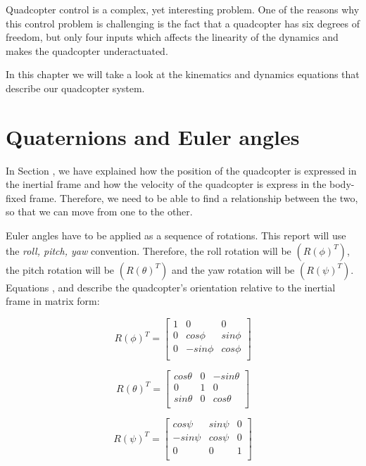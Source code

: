Quadcopter control is a complex, yet interesting problem. One of the reasons why this control problem is challenging is the fact that a quadcopter has six degrees of freedom, but only four inputs which affects the linearity of the dynamics and makes the quadcopter underactuated. 

In this chapter we will take a look at the kinematics and dynamics equations that describe our quadcopter system.

\section{Quaternions and Euler angles}
In Section \label{2.1}, we have explained how the position of the quadcopter is expressed in the inertial frame and how the  velocity of the quadcopter is express in the body-fixed frame. Therefore, we need to be able to find a relationship between the two, so that we can move from one to the other.

Euler angles have to be applied as a sequence of rotations. This report will use the \textit{roll, pitch, yaw} convention. Therefore, the roll rotation will be $(R(\phi)^{T})$, the pitch rotation will be $(R(\theta)^{T})$ and the yaw rotation will be $(R(\psi)^{T})$. Equations \label{rollrotation}, \label{pitchrotation} and \label{yawrotation}  describe the quadcopter's orientation relative to the inertial frame in matrix form:

\begin{equation}
\label{rollrotation}	
 	R(\phi)^{T}=\begin{bmatrix}
 	1 & 0 & 0 \\
 	0 & cos\phi & sin\phi \\
 	0 & -sin\phi & cos\phi \\
 	\end{bmatrix}
 \end{equation}
 
 \begin{equation}
\label{pitchrotation}	
 	R(\theta)^{T}=\begin{bmatrix}
 	cos\theta & 0 & -sin\theta \\
 	0 & 1 & 0 \\
 	sin\theta & 0 & cos\theta \\
 	\end{bmatrix}
 \end{equation}
 
 \begin{equation}
\label{yawrotation}	
 	R(\psi)^{T}=\begin{bmatrix}
 	cos\psi & sin\psi & 0 \\
 	-sin\psi & cos\psi & 0 \\
 	0 & 0 & 1 \\
 	\end{bmatrix}
 \end{equation}
 
